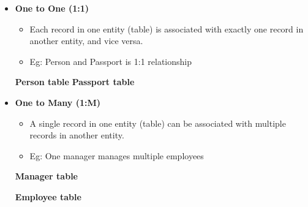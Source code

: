 \begin{flushleft}
	
	\begin{itemize}
		\item \textbf{One to One (1:1)}
		\begin{itemize}
			\item Each record in one entity (table) is associated with exactly one record in another entity, and vice versa. 
			\item Eg: Person and Passport is 1:1 relationship
		\end{itemize}
		\bigskip
		\textbf{Person table}
		\bigskip
		\textbf{Passport table}
		
		\item \textbf{One to Many (1:M)}
		
		\begin{itemize}
			\item A single record in one entity (table) can be associated with multiple records in another entity.
			\item Eg: One manager manages multiple employees
		\end{itemize}
	
		\textbf{Manager table}
		\bigskip
	
		\newpage
		
		\textbf{Employee table}
	

\end{itemize}
\end{flushleft}
